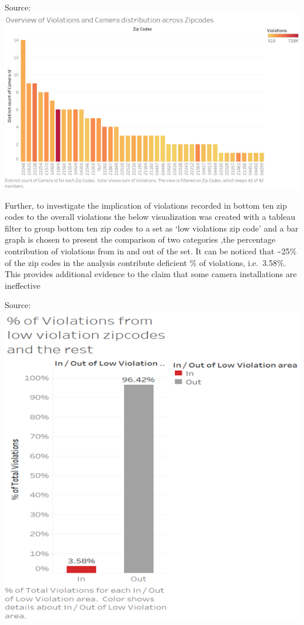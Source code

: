 \documentclass[]{book}
\begin{document}
Source:\citep{tableau}
\includegraphics{images/Image9.png}

Further, to investigate the implication of violations recorded in bottom ten zip codes to the overall violations the below visualization was created with a tableau filter to group bottom ten zip codes to a set as `low violations zip code' and a bar graph is chosen to present the comparison of two categories ,the percentage contribution of violations from in and out of the set. It can be noticed that \textasciitilde{}25\% of the zip codes in the analysis contribute deficient \% of violations, i.e.~3.58\%. This provides additional evidence to the claim that some camera installations are ineffective

Source:\citep{tableau}
\includegraphics{images/Image10.png}
\end{document}
